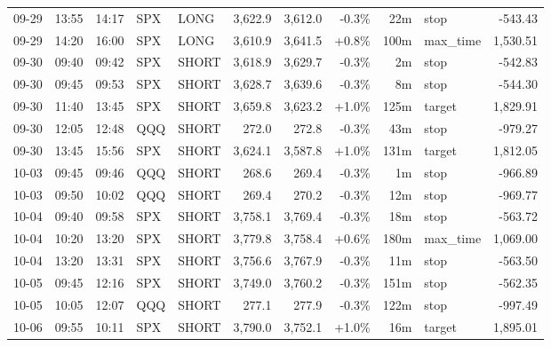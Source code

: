 \documentclass[11pt,a4paper,twoside]{article}
\begin{document}
\begin{center}
\begin{longtable}{>{\color{txtmain}}l l l l l r r r r >{\color{txtmain}}l r}
09-29 & 13:55 & 14:17 & SPX & LONG & 3,622.9 & 3,612.0 & \textcolor{lossred}{-0.3\%} & 22m & stop & \textcolor{lossred}{-543.43} \\
09-29 & 14:20 & 16:00 & SPX & LONG & 3,610.9 & 3,641.5 & \textcolor{wingreen}{+0.8\%} & 100m & max\_time & \textcolor{wingreen}{1,530.51} \\
09-30 & 09:40 & 09:42 & SPX & SHORT & 3,618.9 & 3,629.7 & \textcolor{lossred}{-0.3\%} & 2m & stop & \textcolor{lossred}{-542.83} \\
09-30 & 09:45 & 09:53 & SPX & SHORT & 3,628.7 & 3,639.6 & \textcolor{lossred}{-0.3\%} & 8m & stop & \textcolor{lossred}{-544.30} \\
09-30 & 11:40 & 13:45 & SPX & SHORT & 3,659.8 & 3,623.2 & \textcolor{wingreen}{+1.0\%} & 125m & target & \textcolor{wingreen}{1,829.91} \\
09-30 & 12:05 & 12:48 & QQQ & SHORT & 272.0 & 272.8 & \textcolor{lossred}{-0.3\%} & 43m & stop & \textcolor{lossred}{-979.27} \\
09-30 & 13:45 & 15:56 & SPX & SHORT & 3,624.1 & 3,587.8 & \textcolor{wingreen}{+1.0\%} & 131m & target & \textcolor{wingreen}{1,812.05} \\
10-03 & 09:45 & 09:46 & QQQ & SHORT & 268.6 & 269.4 & \textcolor{lossred}{-0.3\%} & 1m & stop & \textcolor{lossred}{-966.89} \\
10-03 & 09:50 & 10:02 & QQQ & SHORT & 269.4 & 270.2 & \textcolor{lossred}{-0.3\%} & 12m & stop & \textcolor{lossred}{-969.77} \\
10-04 & 09:40 & 09:58 & SPX & SHORT & 3,758.1 & 3,769.4 & \textcolor{lossred}{-0.3\%} & 18m & stop & \textcolor{lossred}{-563.72} \\
10-04 & 10:20 & 13:20 & SPX & SHORT & 3,779.8 & 3,758.4 & \textcolor{wingreen}{+0.6\%} & 180m & max\_time & \textcolor{wingreen}{1,069.00} \\
10-04 & 13:20 & 13:31 & SPX & SHORT & 3,756.6 & 3,767.9 & \textcolor{lossred}{-0.3\%} & 11m & stop & \textcolor{lossred}{-563.50} \\
10-05 & 09:45 & 12:16 & SPX & SHORT & 3,749.0 & 3,760.2 & \textcolor{lossred}{-0.3\%} & 151m & stop & \textcolor{lossred}{-562.35} \\
10-05 & 10:05 & 12:07 & QQQ & SHORT & 277.1 & 277.9 & \textcolor{lossred}{-0.3\%} & 122m & stop & \textcolor{lossred}{-997.49} \\
10-06 & 09:55 & 10:11 & SPX & SHORT & 3,790.0 & 3,752.1 & \textcolor{wingreen}{+1.0\%} & 16m & target & \textcolor{wingreen}{1,895.01} \\

\end{longtable}
\end{center}
\end{document}
